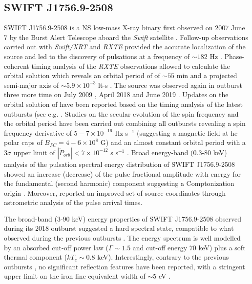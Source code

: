 \documentclass[graybox]{svmult}
\def \swift {{\em Swift\xspace}}
\def \rxte {{\em RXTE\xspace}}
\def \swiftxrt{{\em Swift/XRT\xspace}}
\begin{document}
\subsection{SWIFT J1756.9-2508}

SWIFT J1756.9-2508 is a NS low-mass X-ray binary first observed on 2007 June 7 by the Burst Alert Telescope aboard the \swift{} satellite \cite{Krimm2007}. Follow-up observations carried out with \swiftxrt{} and \rxte{} provided the accurate localization of the source and led to the discovery of pulsations at a frequency of $\sim182$ Hz \cite{Markwardt2007b}. Phase-coherent timing analysis of the \rxte{} observations allowed to calculate the orbital solution which reveals an orbital period of of  $\sim55$ min and a projected semi-major axis of $\sim5.9\times 10^{-3}$ lt-s \cite{Krimm2007}. 
The source was observed again in outburst three more time on July 2009 \cite{Patruno2009b,Patruno2010d}, April 2018 \cite{Mereminskiy2018,Bult2018,Sanna2018d} and June 2019 \cite{Sanna2019}. Updates on the orbital solution of have been reported based on the timing analysis of the latest outbursts (see e.g. \cite{Patruno2010d,Bult2018,Sanna2018d}. Studies on the secular evolution of the spin frequency and the orbital period have been carried out combining all outbursts revealing a spin frequency derivative of $5-7 \times 10^{-16}$ Hz s$^{-1}$ (suggesting a magnetic field at he polar caps of $B_{PC}=4-6\times 10^8$ G) and an almost constant orbital period with a $3\sigma$ upper limit of $|\dot{P}_{orb}|< 7\times 10^{-12}$ s s$^{-1}$ \cite{Bult2018,Sanna2018d}. Broad energy-band (0.3-80 keV) analysis of the pulsation spectral energy distribution of SWIFT J1756.9-2508 showed an increase (decrease) of the pulse fractional amplitude with energy for the fundamental (second harmonic) component suggesting a Comptonization origin \cite{Gierlinski2002, Ibragimov2009}. Moreover, \cite{Bult2018} reported an improved set of source coordinates through astrometric analysis of the pulse arrival times.   

The broad-band (3-90 keV) energy properties of SWIFT J1756.9-2508 observed during its 2018 outburst suggested a hard spectral state, compatible to what observed during the previous outbursts \cite{Linares2008b,Patruno2010d}. The energy spectrum is well modelled by an absorbed cut-off power law ($\Gamma\sim1.5$ and cut-off energy 70 keV) plus a soft thermal component ($kT_e\sim 0.8$ keV). Interestingly, contrary to the previous outbursts \cite{Patruno2010d}, no significant reflection features have been reported, with a stringent upper limit on the iron line equivalent width of $\sim5$ eV \cite{Sanna2018d}.
\end{document}

